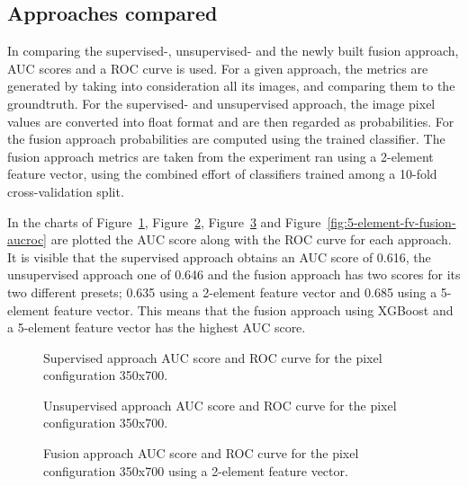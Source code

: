 \subsection{Approaches compared}
In comparing the supervised-, unsupervised- and the newly built fusion approach, AUC scores and a ROC curve is used. For a given approach, the metrics are generated by taking into consideration all its images, and comparing them to the groundtruth. For the supervised- and unsupervised approach, the image pixel values are converted into float format and are then regarded as probabilities. For the fusion approach probabilities are computed using the trained classifier. The fusion approach metrics are taken from the experiment ran using a 2-element feature vector, using the combined effort of classifiers trained among a 10-fold cross-validation split.

In the charts of Figure~\ref{fig:supervised-aucroc}, Figure~\ref{fig:unsupervised-aucroc}, Figure~\ref{fig:fusion-aucroc} and Figure~\ref{fig:5-element-fv-fusion-aucroc} are plotted the AUC score along with the ROC curve for each approach. It is visible that the supervised approach obtains an AUC score of 0.616, the unsupervised approach one of 0.646 and the fusion approach has two scores for its two different presets; 0.635 using a 2-element feature vector and 0.685 using a 5-element feature vector. This means that the fusion approach using XGBoost and a 5-element feature vector has the highest AUC score.

\begin{figure}[ht]
  \centering
  
  \caption{Supervised approach AUC score and ROC curve for the pixel configuration 350x700.
  }\label{fig:supervised-aucroc}
\end{figure}

\begin{figure}[ht]
  \centering
  
  \caption{Unsupervised approach AUC score and ROC curve for the pixel configuration 350x700.
  }\label{fig:unsupervised-aucroc}
\end{figure}

\begin{figure}[ht]
  \centering
  
  \caption{Fusion approach AUC score and ROC curve for the pixel configuration 350x700 using a 2-element feature vector.
  }\label{fig:fusion-aucroc}
\end{figure}

